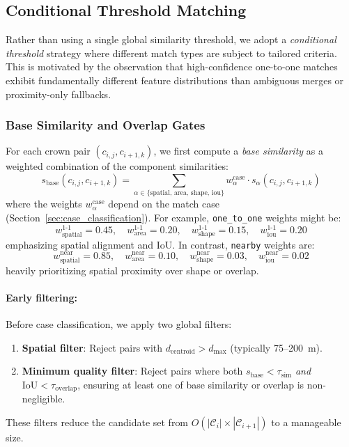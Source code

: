 \subsection{Conditional Threshold Matching}
\label{sec:conditional_matching}

Rather than using a single global similarity threshold, we adopt a \emph{conditional threshold} strategy where different match types are subject to tailored criteria. This is motivated by the observation that high-confidence one-to-one matches exhibit fundamentally different feature distributions than ambiguous merges or proximity-only fallbacks.

\subsubsection{Base Similarity and Overlap Gates}

For each crown pair $(c_{i,j}, c_{i+1,k})$, we first compute a \emph{base similarity} as a weighted combination of the component similarities:
\[
s_{\text{base}}(c_{i,j}, c_{i+1,k}) = \sum_{\alpha \in \{\text{spatial, area, shape, iou}\}} w_\alpha^{\text{case}} \cdot s_\alpha(c_{i,j}, c_{i+1,k})
\]
where the weights $w_\alpha^{\text{case}}$ depend on the match case (Section~\ref{sec:case_classification}). For example, \texttt{one\_to\_one} weights might be:
\[
w_{\text{spatial}}^{\text{1-1}} = 0.45, \quad w_{\text{area}}^{\text{1-1}} = 0.20, \quad w_{\text{shape}}^{\text{1-1}} = 0.15, \quad w_{\text{iou}}^{\text{1-1}} = 0.20
\]
emphasizing spatial alignment and IoU. In contrast, \texttt{nearby} weights are:
\[
w_{\text{spatial}}^{\text{near}} = 0.85, \quad w_{\text{area}}^{\text{near}} = 0.10, \quad w_{\text{shape}}^{\text{near}} = 0.03, \quad w_{\text{iou}}^{\text{near}} = 0.02
\]
heavily prioritizing spatial proximity over shape or overlap.

\paragraph{Early filtering:} Before case classification, we apply two global filters:
\begin{enumerate}
    \item \textbf{Spatial filter}: Reject pairs with $d_{\text{centroid}} > d_{\max}$ (typically 75--200~m).
    \item \textbf{Minimum quality filter}: Reject pairs where both $s_{\text{base}} < \tau_{\text{sim}}$ \emph{and} $\text{IoU} < \tau_{\text{overlap}}$, ensuring at least one of base similarity or overlap is non-negligible.
\end{enumerate}
These filters reduce the candidate set from $O(|\mathcal{C}_i| \times |\mathcal{C}_{i+1}|)$ to a manageable size.

